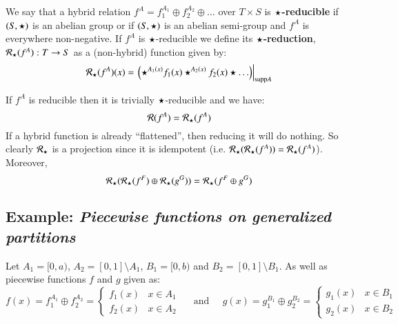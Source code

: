 \begin{definition}
	We say that a hybrid relation $f^A = f_1^{A_1} \oplus f_2^{A_2} \oplus \ldots$ over $T \times S$ 
	is $\star$\textbf{-reducible} if $(S, \star)$ is an abelian group 
	or if $(S, \star)$ is an abelian semi-group and $f^A$ is everywhere non-negative.
	If $f^A$ is $\star$-reducible we define its $\star$\textbf{-reduction}, $\mathcal{R}_\star(f^A) :  T \to S$ 
	as a (non-hybrid) function given by:
	\begin{equation}
		\mathcal{R}_\star (f^A)(x) = \left.\left(\star^{A_1(x)} f_1(x) \star^{A_2(x)} f_2(x) \star \ldots \right)\right|_{\text{supp} A}
	\end{equation}
\end{definition}


If $f^A$ is reducible then it is trivially $\star$-reducible and we have:
\begin{equation}
	\mathcal{R}(f^A) = \mathcal{R}_\star(f^A)
\end{equation}
If a hybrid function is already ``flattened'', then reducing it will do nothing.
So clearly $\mathcal{R}_\star$ is a projection since it is idempotent  (i.e. $\mathcal{R}_\star ( \mathcal{R}_\star( f^A)) = \mathcal{R}_\star(f^A)$).
Moreover,
\begin{equation}
	\mathcal{R}_\star( \mathcal{R}_\star(f^F) \oplus \mathcal{R}_\star(g^G)) =\mathcal{R}_\star( f^F \oplus g^G)
\end{equation}



\subsection{Example: \emph{Piecewise functions on generalized partitions}} 
Let $A_1 = [0,a)$, $A_2 = [0,1] \setminus A_1$, $B_1 = [0,b)$ and $B_2 = [0,1] \setminus B_1$.
As well as piecewise functions $f$ and $g$ given as:
\begin{equation*}
	f(x) = f_1^{A_1} \oplus f_2^{A_2}
		= \begin{cases}
			f_1(x) & x \in A_1 \\
			f_2(x) & x \in A_2
		\end{cases}
	\;\;\;\;\; \text{and} \;\;\;\;\;
	g(x) = g_1^{B_1} \oplus g_2^{B_2}
		= \begin{cases}
			g_1(x) & x \in B_1 \\
			g_2(x) & x \in B_2
		\end{cases}
\end{equation*}

